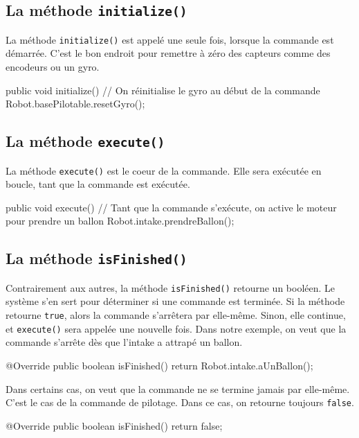 \documentclass[12pt]{report}
\begin{document}
\subsection{La méthode \texttt{initialize()}}
La méthode \texttt{initialize()} est appelé une seule fois, lorsque la commande est démarrée. C'est le bon endroit pour remettre à zéro des capteurs comme des encodeurs ou un gyro.

\begin{code}
\Override
public void initialize() {
	// On réinitialise le gyro au début de la commande
	Robot.basePilotable.resetGyro();
}
\end{code}

\subsection{La méthode \texttt{execute()}}
La méthode \texttt{execute()} est le coeur de la commande. Elle sera exécutée en boucle, tant que la commande est exécutée.

\begin{code}
\Override
public void execute() {
	// Tant que la commande s'exécute, on active le moteur pour prendre un ballon
	Robot.intake.prendreBallon();
}
\end{code}

\subsection{La méthode \texttt{isFinished()}}
Contrairement aux autres, la méthode \texttt{isFinished()} retourne un booléen. Le système s'en sert pour déterminer si une commande est terminée. Si la méthode retourne \texttt{true}, alors la commande s'arrêtera par elle-même. Sinon, elle continue, et \texttt{execute()} sera appelée une nouvelle fois. Dans notre exemple, on veut que la commande s'arrête dès que l'intake a attrapé un ballon.

\begin{code}
@Override
public boolean isFinished() {
  return Robot.intake.aUnBallon();
}
\end{code}

Dans certains cas, on veut que la commande ne se termine jamais par elle-même. C'est le cas de la commande de pilotage. Dans ce cas, on retourne toujours \texttt{false}.

\begin{code}
@Override
public boolean isFinished() {
  return false;
}
\end{code}
\end{document}

